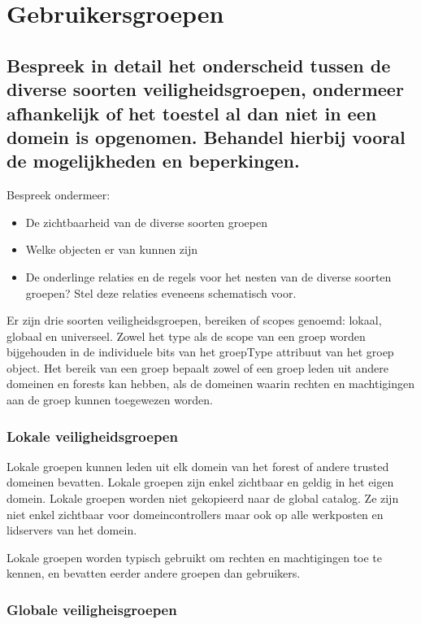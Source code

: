 \chapter{Gebruikersgroepen}

\section{Bespreek in detail het onderscheid tussen de diverse soorten
veiligheidsgroepen, ondermeer afhankelijk of het toestel al dan niet in een
domein is opgenomen. Behandel hierbij vooral de mogelijkheden en beperkingen.}

Bespreek ondermeer:
\begin{itemize}
	\item De zichtbaarheid van de diverse soorten groepen
	\item Welke objecten er van kunnen zijn
	\item De onderlinge relaties en de regels voor het nesten van de diverse
		soorten groepen? Stel deze relaties eveneens schematisch voor.
\end{itemize}

Er zijn drie soorten veiligheidsgroepen, bereiken of scopes genoemd: lokaal,
globaal en universeel. Zowel het type als de scope van een groep worden
bijgehouden in de individuele bits van het groepType attribuut van het groep
object. Het bereik van een groep bepaalt zowel of een groep leden uit andere
domeinen en forests kan hebben, als de domeinen waarin rechten en machtigingen
aan de groep kunnen toegewezen worden.

\subsection{Lokale veiligheidsgroepen}

Lokale groepen kunnen leden uit elk domein van het forest of andere trusted
domeinen bevatten. Lokale groepen zijn enkel zichtbaar en geldig in het eigen
domein. Lokale groepen worden niet gekopieerd naar de global catalog. Ze zijn
niet enkel zichtbaar voor domeincontrollers maar ook op alle werkposten en
lidservers van het domein.

Lokale groepen worden typisch gebruikt om rechten en machtigingen toe te kennen,
en bevatten eerder andere groepen dan gebruikers.

\subsection{Globale veiligheisgroepen}

